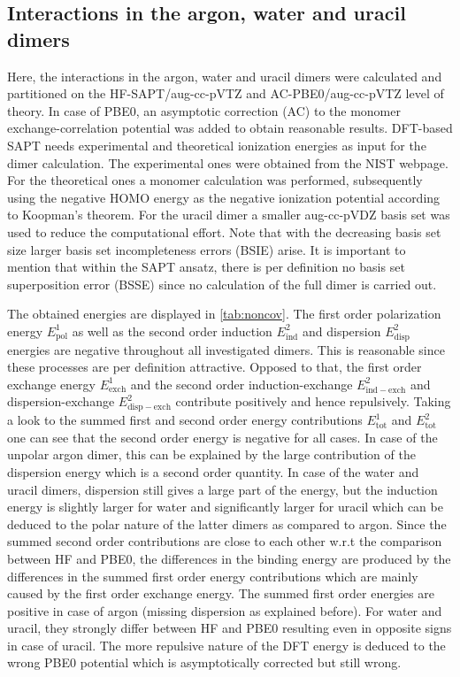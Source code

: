 \documentclass[a4paper,12pt]{scrartcl}
\newcommand{\m}[1]{\mathrm{#1}}
\begin{document}
\subsection{Interactions in the argon, water and uracil dimers}
%
Here, the interactions in the argon, water and uracil dimers were calculated and partitioned on the HF-SAPT/aug-cc-pVTZ\autocite[]{aug-cc-pvxz,aug-cc-pvxz-al_ar} and AC-PBE0\autocite[]{pbe0}/aug-cc-pVTZ level of theory. In case of PBE0, an asymptotic correction (AC) to the monomer exchange-correlation potential was added to obtain reasonable results. DFT-based SAPT needs experimental and theoretical ionization energies as input for the dimer calculation. The experimental ones were obtained from the NIST webpage\autocite[]{nist}. For the theoretical ones a monomer calculation was performed, subsequently using the negative HOMO energy as the negative ionization potential according to Koopman's theorem. For the uracil dimer a smaller aug-cc-pVDZ basis set was used to reduce the computational effort. Note that with the decreasing basis set size larger basis set incompleteness errors (BSIE) arise. It is important to mention that within the SAPT ansatz, there is per definition no basis set superposition error (BSSE) since no calculation of the full dimer is carried out.

The obtained energies are displayed in \autoref{tab:noncov}. The first order polarization energy $ E^1_\m{pol} $ as well as the second order induction $ E^2_\m{ind} $ and dispersion $ E^2_\m{disp} $ energies are negative throughout all investigated dimers. This is reasonable since these processes are per definition attractive. Opposed to that, the first order exchange energy $ E^1_\m{exch} $ and the second order induction-exchange $ E^2_\m{ind-exch} $ and dispersion-exchange $ E^2_\m{disp-exch} $ contribute positively and hence repulsively. Taking a look to the summed first and second order energy contributions $ E^1_\m{tot} $ and $ E^2_\m{tot} $ one can see that the second order energy is negative for all cases. In case of the unpolar argon dimer, this can be explained by the large contribution of the dispersion energy which is a second order quantity. In case of the water and uracil dimers, dispersion still gives a large part of the energy, but the induction energy is slightly larger for water and significantly larger for uracil which can be deduced to the polar nature of the latter dimers as compared to argon. Since the summed second order contributions are close to each other w.r.t the comparison between HF and PBE0, the differences in the binding energy are produced by the differences in the summed first order energy contributions which are mainly caused by the first order exchange energy. The summed first order energies are positive in case of argon (missing dispersion as explained before). For water and uracil, they strongly differ between HF and PBE0 resulting even in opposite signs in case of uracil. The more repulsive nature of the DFT energy is deduced to the wrong PBE0 potential which is asymptotically corrected but still wrong.
\end{document}
